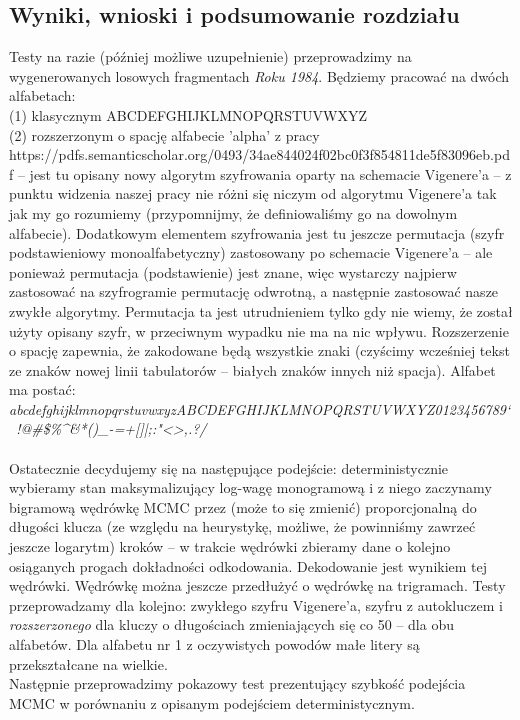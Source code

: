 \documentclass[a4paper]{article}
\begin{document}
\subsection{Wyniki, wnioski i podsumowanie rozdziału}
Testy na razie (później możliwe uzupełnienie) przeprowadzimy na wygenerowanych losowych fragmentach \textit{Roku 1984}. Będziemy pracować na dwóch alfabetach:\\
(1) klasycznym ABCDEFGHIJKLMNOPQRSTUVWXYZ\\
(2) rozszerzonym o spację alfabecie 'alpha' z pracy\\ https://pdfs.semanticscholar.org/0493/34ae844024f02bc0f3f854811de5f83096eb.pdf – jest tu opisany nowy algorytm szyfrowania oparty na schemacie Vigenere'a – z punktu widzenia naszej pracy nie różni się niczym od algorytmu Vigenere'a tak jak my go rozumiemy (przypomnijmy, że definiowaliśmy go na dowolnym alfabecie). Dodatkowym elementem szyfrowania jest tu jeszcze permutacja (szyfr podstawieniowy monoalfabetyczny) zastosowany po schemacie Vigenere'a – ale ponieważ permutacja (podstawienie) jest znane, więc wystarczy najpierw zastosować na szyfrogramie permutację odwrotną, a następnie zastosować nasze zwykłe algorytmy. Permutacja ta jest utrudnieniem tylko gdy nie wiemy, że został użyty opisany szyfr, w przeciwnym wypadku nie ma na nic wpływu. Rozszerzenie o spację zapewnia, że zakodowane będą wszystkie znaki (czyścimy wcześniej tekst ze znaków nowej linii tabulatorów – białych znaków innych niż spacja). Alfabet ma postać:\\
\textit{abcdefghijklmnopqrstuvwxyzABCDEFGHIJKLMNOPQRSTUVWXYZ0123456789`~!@#\$\%\^&*()\_-=+{}[]|;:"<>,.?/ }\\\\
Ostatecznie decydujemy się na następujące podejście: deterministycznie wybieramy stan maksymalizujący log-wagę monogramową i z niego zaczynamy bigramową wędrówkę MCMC przez (może to się zmienić) proporcjonalną do długości klucza (ze względu na heurystykę, możliwe, że powinniśmy zawrzeć jeszcze logarytm) kroków – w trakcie wędrówki zbieramy dane o kolejno osiąganych progach dokładności odkodowania. Dekodowanie jest wynikiem tej wędrówki. Wędrówkę można jeszcze przedłużyć o wędrówkę na trigramach. Testy przeprowadzamy dla kolejno: zwykłego szyfru Vigenere'a, szyfru z autokluczem i \textit{rozszerzonego} dla kluczy o długościach zmieniających się co 50 – dla obu alfabetów. Dla alfabetu nr 1 z oczywistych powodów małe litery są przekształcane na wielkie.\\
Następnie przeprowadzimy pokazowy test prezentujący szybkość podejścia MCMC w porównaniu z opisanym podejściem deterministycznym.
\end{document}
